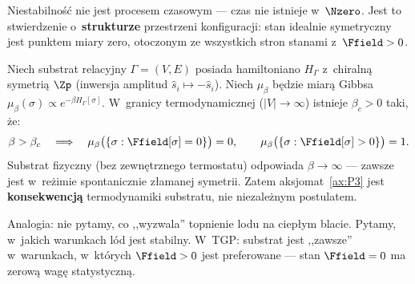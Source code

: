 Niestabilno\'s\'c nie jest procesem czasowym --- czas nie istnieje
w~$\Nzero$. Jest to stwierdzenie o~\textbf{strukturze} przestrzeni
konfiguracji: stan idealnie symetryczny jest punktem miary zero,
otoczonym ze wszystkich stron stanami z~$\Ffield > 0$.

\begin{proposition}\label{prop:P3-deriv}
Niech substrat relacyjny $\Gamma = (V, E)$ posiada hamiltoniano
$H_\Gamma$ z~chiralną symetri\k{a} $\Zp$ (inwersja amplitud
$\hat{s}_i \mapsto -\hat{s}_i$). Niech $\mu_\beta$ b\k{e}dzie
miar\k{a} Gibbsa $\mu_\beta(\sigma) \propto e^{-\beta H_\Gamma[\sigma]}$.
W~granicy termodynamicznej ($|V| \to \infty$) istnieje
$\beta_c > 0$ taki, \.ze:
\begin{equation}
    \beta > \beta_c
    \quad\Longrightarrow\quad
    \mu_\beta\bigl(\{\sigma: \Ffield[\sigma] = 0\}\bigr) = 0,
    \qquad
    \mu_\beta\bigl(\{\sigma: \Ffield[\sigma] > 0\}\bigr) = 1.
\end{equation}
Substrat fizyczny (bez zewn\k{e}trznego termostatu) odpowiada
$\beta \to \infty$ --- zawsze jest w~re\.zimie spontanicznie
z\l{}amanej symetrii. Zatem aksjomat~\ref{ax:P3} jest
\textbf{konsekwencj\k{a}} termodynamiki substratu,
nie niezale\.znym postulatem.
\end{proposition}

Analogia: nie pytamy, co ,,wyzwala'' topnienie lodu na ciep\l{}ym blacie.
Pytamy, w~jakich warunkach l\'od jest stabilny. W~TGP: substrat
jest ,,zawsze'' w~warunkach, w~kt\'orych $\Ffield > 0$
jest preferowane --- stan $\Ffield = 0$ ma zerow\k{a} wag\k{e}
statystyczn\k{a}.

